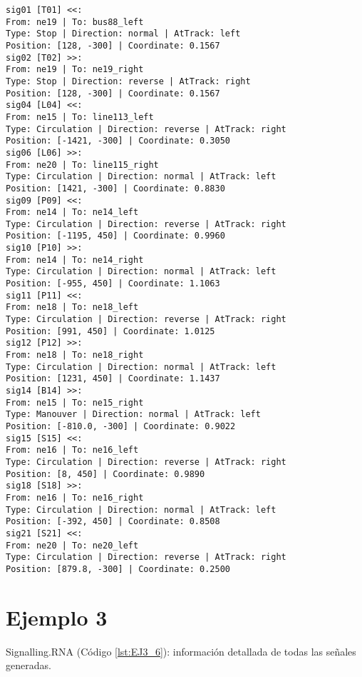 	\begin{lstlisting}[language = {}, caption = Signalling.RNA, label = {lst:EJ2_6}]
sig01 [T01] <<:
From: ne19 | To: bus88_left
Type: Stop | Direction: normal | AtTrack: left 
Position: [128, -300] | Coordinate: 0.1567
sig02 [T02] >>:
From: ne19 | To: ne19_right
Type: Stop | Direction: reverse | AtTrack: right 
Position: [128, -300] | Coordinate: 0.1567
sig04 [L04] <<:
From: ne15 | To: line113_left
Type: Circulation | Direction: reverse | AtTrack: right 
Position: [-1421, -300] | Coordinate: 0.3050
sig06 [L06] >>:
From: ne20 | To: line115_right
Type: Circulation | Direction: normal | AtTrack: left 
Position: [1421, -300] | Coordinate: 0.8830
sig09 [P09] <<:
From: ne14 | To: ne14_left
Type: Circulation | Direction: reverse | AtTrack: right 
Position: [-1195, 450] | Coordinate: 0.9960
sig10 [P10] >>:
From: ne14 | To: ne14_right
Type: Circulation | Direction: normal | AtTrack: left 
Position: [-955, 450] | Coordinate: 1.1063
sig11 [P11] <<:
From: ne18 | To: ne18_left
Type: Circulation | Direction: reverse | AtTrack: right 
Position: [991, 450] | Coordinate: 1.0125
sig12 [P12] >>:
From: ne18 | To: ne18_right
Type: Circulation | Direction: normal | AtTrack: left 
Position: [1231, 450] | Coordinate: 1.1437
sig14 [B14] >>:
From: ne15 | To: ne15_right
Type: Manouver | Direction: normal | AtTrack: left 
Position: [-810.0, -300] | Coordinate: 0.9022
sig15 [S15] <<:
From: ne16 | To: ne16_left
Type: Circulation | Direction: reverse | AtTrack: right 
Position: [8, 450] | Coordinate: 0.9890
sig18 [S18] >>:
From: ne16 | To: ne16_right
Type: Circulation | Direction: normal | AtTrack: left 
Position: [-392, 450] | Coordinate: 0.8508
sig21 [S21] <<:
From: ne20 | To: ne20_left
Type: Circulation | Direction: reverse | AtTrack: right 
Position: [879.8, -300] | Coordinate: 0.2500
	\end{lstlisting}
	\section{Ejemplo 3}
	Signalling.RNA (Código \ref{lst:EJ3_6}): información detallada de todas las señales generadas.
	
